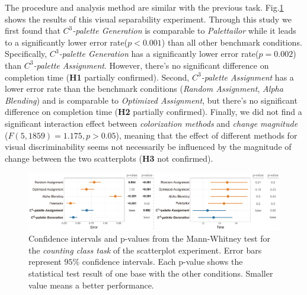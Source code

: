 {
The procedure and analysis method are similar with the previous task. Fig.\ref{fig:counting-results} shows the results of this visual separability experiment.
Through this study we first found that \emph{$C^3$-palette Generation} is comparable to \emph{Palettailor} while it leads to a significantly lower error rate(\emph{$p<0.001$}) than all other benchmark conditions. Specifically, \emph{$C^3$-palette Generation} has a significantly lower error rate(\emph{$p=0.002$}) than \emph{$C^3$-palette Assignment}. However, there's no significant difference on completion time (\textbf{H1} partially confirmed).
Second, \emph{$C^3$-palette Assignment} has a lower error rate than the benchmark conditions (\emph{Random Assignment}, \emph{Alpha Blending}) and is comparable to \emph{Optimized Assignment}, but there's no significant difference on completion time (\textbf{H2} partially confirmed).
Finally, we did not find a significant interaction effect between \emph{colorization methods} and \emph{change magnitude} ($F(5, 1859) = 1.175, p > 0.05$), meaning that the effect of different methods for visual discriminability seems not necessarily be influenced by the magnitude of change between the two scatterplots (\textbf{H3} not confirmed).

\begin{figure}[!tb]
\centering
\includegraphics[width=1\linewidth]{figures/counting-results.pdf}
\caption{Confidence intervals and p-values from the Mann-Whitney test for the \emph{counting class task} of the scatterplot experiment. Error bars represent $95\%$ confidence intervals. Each p-value shows the statistical test result of one base with the other conditions. Smaller value means a better performance.}
\vspace*{-3mm}
\label{fig:counting-results}
\end{figure}

}
